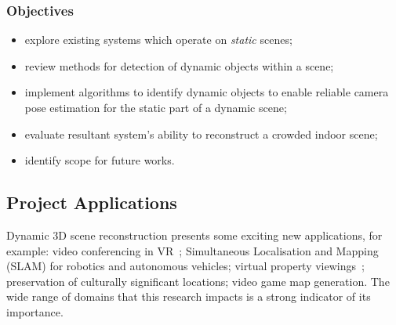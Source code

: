 \subsubsection{Objectives}
\begin{itemize}
	\item explore existing systems which operate on \emph{static} scenes;
	\item review methods for detection of dynamic objects within a scene;
	\item implement algorithms to identify dynamic objects to enable reliable camera pose estimation for the static part
	of a dynamic scene;
	\item evaluate resultant system's ability to reconstruct a crowded indoor scene;
	\item identify scope for future works.
\end{itemize}

\subsection{Project Applications}\label{subsec:project-applications}
Dynamic 3D scene reconstruction presents some exciting new applications, for example: video conferencing in VR~\cite{Campbell2019UsesOV};
Simultaneous Localisation and Mapping (SLAM) for robotics and autonomous vehicles;
virtual property viewings~\cite{virtualviewing};
preservation of culturally significant locations;
video game map generation.
The wide range of domains that this research impacts is a strong indicator of its importance.
